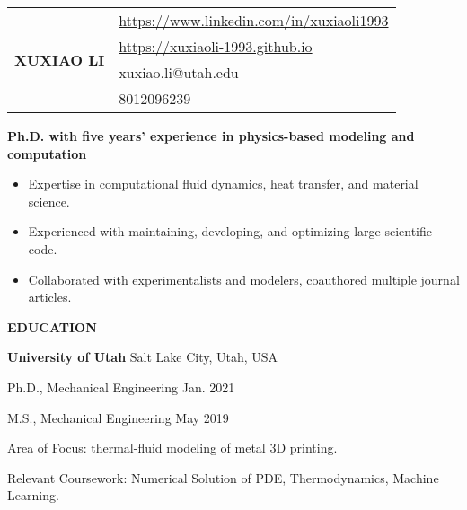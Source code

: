 \documentclass[11pt, letterpaper]{article}
\begin{document}
\begin{tabular}{@{} p{} p{} @{}}
   \multirow{4}{*}{{\textbf{\huge XUXIAO LI}}} & 
    \href{https://www.linkedin.com/in/xuxiaoli1993}{https://www.linkedin.com/in/xuxiaoli1993} \\
     & \href{https://xuxiaoli-1993.github.io}{https://xuxiaoli-1993.github.io} \\
     & xuxiao.li@utah.edu \\
     & 8012096239
\end{tabular}

% 
% 
% 

\vspace{24pt}

\textbf{Ph.D. with five years' experience in physics-based modeling and computation}
\begin{itemize}[leftmargin=*, labelsep=5mm]
   \item Expertise in computational fluid dynamics, heat transfer, and material science.
   \item Experienced with maintaining, developing, and optimizing large scientific code.
   \item Collaborated with experimentalists and modelers, coauthored multiple journal articles.
\end{itemize}

\vspace{12pt}

\textbf{EDUCATION}

\fullrule

\textbf{University of Utah} \hfill Salt Lake City, Utah, USA

Ph.D., Mechanical Engineering  \hfill Jan. 2021

M.S., Mechanical Engineering  \hfill May 2019

Area of Focus: thermal-fluid modeling of metal 3D printing.

Relevant Coursework: Numerical Solution of PDE, Thermodynamics, Machine Learning.

\vskip 6pt
\end{document}
